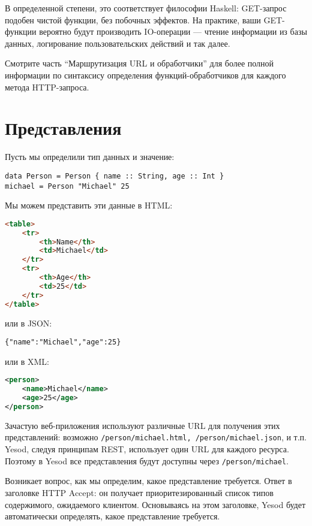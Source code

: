 В определенной степени, это соответствует философии Haskell: GET-запрос подобен чистой функции, без побочных эффектов. На практике, ваши GET-функции вероятно будут производить IO-операции --- чтение информации из базы данных, логирование пользовательских действий и так далее.

Смотрите часть “Маршрутизация URL и обработчики” для более полной информации по синтаксису определения функций-обработчиков для каждого метода HTTP-запроса.

\section{Представления}

Пусть мы определили тип данных и значение:

\begin{lstlisting}
data Person = Person { name :: String, age :: Int }
michael = Person "Michael" 25
\end{lstlisting}

Мы можем представить эти данные в HTML:
\begin{lstlisting}[language=HTML]
 <table>
    <tr>
        <th>Name</th>
        <td>Michael</td>
    </tr>
    <tr>
        <th>Age</th>
        <td>25</td>
    </tr>
</table>
\end{lstlisting}

или в JSON:

\begin{verbatim}
{"name":"Michael","age":25}
\end{verbatim}

или в XML:
\begin{lstlisting}[language=XML]
<person>
    <name>Michael</name>
    <age>25</age>
</person>
\end{lstlisting}

Зачастую веб-приложения используют различные URL для получения этих представлений: возможно \lstinline'/person/michael.html, /person/michael.json', и т.п. Yesod, следуя принципам REST, использует один URL для каждого ресурса. Поэтому в Yesod все представления будут доступны через \lstinline'/person/michael'.

Возникает вопрос, как мы определим, какое представление требуется. Ответ в заголовке HTTP Accept: он получает приоритезированный список типов содержимого, ожидаемого клиентом. Основываясь на этом заголовке, Yesod будет автоматически определять, какое представление требуется.

